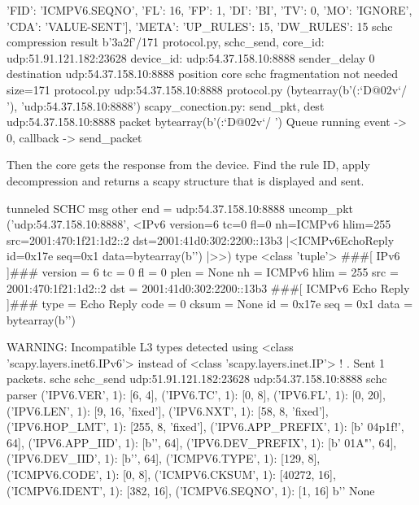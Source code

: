 \begin{termc}[backgroundcolor=\color{palerod}, basicstyle=\ttfamily\tiny]
{    {'FID': 'ICMPV6.SEQNO', 'FL': 16, 'FP': 1, 'DI': 'BI', 'TV': 0, 'MO': 'IGNORE', 'CDA': 'VALUE-SENT'}], 
    'META': {'UP_RULES': 15, 'DW_RULES': 15}}
schc compression result b'\x3a\x2f'/171
protocol.py, schc_send, core_id:  udp:51.91.121.182:23628 device_id:  udp:54.37.158.10:8888 sender_delay 0 destination udp:54.37.158.10:8888 position core
schc fragmentation not needed size=171
protocol.py udp:54.37.158.10:8888
protocol.py (bytearray(b'(:`D@\x02v`/ '), 'udp:54.37.158.10:8888')
scapy_conection.py: send_pkt, dest  udp:54.37.158.10:8888 packet bytearray(b'(:`D@\x02v`/ ')
Queue running event -> 0, callback -> send_packet
\end{termc}

Then the core gets the response from the device. Find the rule ID, apply decompression and returns a scapy structure that is displayed and sent.

\begin{termc}[backgroundcolor=\color{palerod}, basicstyle=\ttfamily\tiny]
tunneled SCHC msg
other end = udp:54.37.158.10:8888
uncomp_pkt ('udp:54.37.158.10:8888', <IPv6  version=6 tc=0 fl=0 nh=ICMPv6 hlim=255 src=2001:470:1f21:1d2::2 dst=2001:41d0:302:2200::13b3 |<ICMPv6EchoReply  id=0x17e seq=0x1 data=bytearray(b'') |>>) type <class 'tuple'>
###[ IPv6 ]### 
  version   = 6
  tc        = 0
  fl        = 0
  plen      = None
  nh        = ICMPv6
  hlim      = 255
  src       = 2001:470:1f21:1d2::2
  dst       = 2001:41d0:302:2200::13b3
###[ ICMPv6 Echo Reply ]### 
     type      = Echo Reply
     code      = 0
     cksum     = None
     id        = 0x17e
     seq       = 0x1
     data      = bytearray(b'')

WARNING: Incompatible L3 types detected using <class 'scapy.layers.inet6.IPv6'> instead of <class 'scapy.layers.inet.IP'> !
.
Sent 1 packets.
schc schc_send udp:51.91.121.182:23628 udp:54.37.158.10:8888
schc parser {('IPV6.VER', 1): [6, 4], 
             ('IPV6.TC', 1): [0, 8], 
             ('IPV6.FL', 1): [0, 20], 
             ('IPV6.LEN', 1): [9, 16, 'fixed'], 
             ('IPV6.NXT', 1): [58, 8, 'fixed'], 
             ('IPV6.HOP_LMT', 1): [255, 8, 'fixed'], 
             ('IPV6.APP_PREFIX', 1): [b' \x04p\x1f!', 64], 
             ('IPV6.APP_IID', 1): [b'', 64],
             ('IPV6.DEV_PREFIX', 1): [b' \x01A"', 64], 
             ('IPV6.DEV_IID', 1): [b'', 64], 
             ('ICMPV6.TYPE', 1): [129, 8], 
             ('ICMPV6.CODE', 1): [0, 8], 
             ('ICMPV6.CKSUM', 1): [40272, 16], 
             ('ICMPV6.IDENT', 1): [382, 16], 
             ('ICMPV6.SEQNO', 1): [1, 16]} b'' None
\end{termc}             
             
